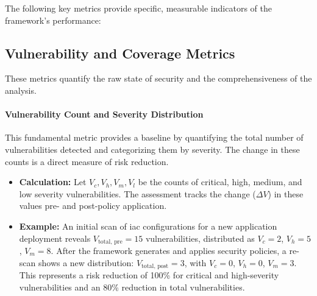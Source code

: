The following key metrics provide specific, measurable indicators of the framework's performance:

\subsection*{Vulnerability and Coverage Metrics}
These metrics quantify the raw state of security and the comprehensiveness of the analysis.

\paragraph{Vulnerability Count and Severity Distribution} This fundamental metric provides a baseline by quantifying the total number of vulnerabilities detected and categorizing them by severity. The change in these counts is a direct measure of risk reduction.
\begin{itemize}
    \item \textbf{Calculation:} Let \( V_c, V_h, V_m, V_l \) be the counts of critical, high, medium, and low severity vulnerabilities. The assessment tracks the change (\( \Delta V \)) in these values pre- and post-policy application.
    \item \textbf{Example:} An initial scan of \gls{iac} configurations for a new application deployment reveals \( V_{\text{total, pre}} = 15 \) vulnerabilities, distributed as \( V_c = 2 \), \( V_h = 5 \), \( V_m = 8 \). After the framework generates and applies security policies, a re-scan shows a new distribution: \( V_{\text{total, post}} = 3 \), with \( V_c = 0 \), \( V_h = 0 \), \( V_m = 3 \). This represents a risk reduction of 100\% for critical and high-severity vulnerabilities and an 80\% reduction in total vulnerabilities.
\end{itemize}

